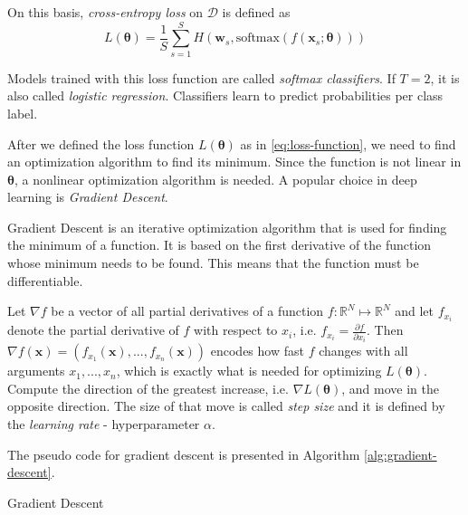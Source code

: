 On this basis, \textit{cross-entropy loss} on $\mathcal{D}$ is defined as
\begin{equation} \label{eq:loss-function}
L(\pmb \theta) = \frac{1}{S} \sum_{s=1}^{S} H (\pmb w_s, \text{softmax} (f(\pmb x_s ; \pmb \theta)))
\end{equation}

Models trained with this loss function are called \textit{softmax classifiers}. If $T = 2$, it is also called \textit{logistic regression}. Classifiers learn to predict probabilities per class label.

After we defined the loss function $L(\pmb \theta)$  as in \ref{eq:loss-function}, we need to find an optimization algorithm to find its minimum. Since the function is not linear in $\pmb \theta$, a nonlinear optimization algorithm is needed. A popular choice in deep learning is \textit{Gradient Descent}.

Gradient Descent is an iterative optimization algorithm that is used for finding the minimum of a function. It is based on the first derivative of the function whose minimum needs to be found. This means that the function must be differentiable. 

Let $\nabla f$ be a vector of all partial derivatives of a function $f: \mathbb{R}^N \mapsto \mathbb{R}^N$ and let $f_{x_i}$ denote the partial derivative of $f$ with respect to $x_i$, i.e. $f_{x_i} = \frac{\partial f}{\partial x_i}$. Then $\nabla f(\pmb x) = (f_{x_1}(\pmb x), ..., f_{x_n}(\pmb x))$  encodes how fast $f$ changes with all arguments $x_1, ..., x_n$, which is exactly what is needed for optimizing $L(\pmb \theta)$. Compute the direction of the greatest increase, i.e. $\nabla L(\pmb \theta)$, and move in the opposite direction. The size of that move is called \textit{step size} and it is defined by the \textit{learning rate} - hyperparameter $\alpha$.  

The pseudo code for gradient descent is presented in Algorithm \ref{alg:gradient-descent}.

\begin{algorithm}[htb]
\caption{Gradient Descent}
\label{alg:gradient-descent}


\end{algorithm}

